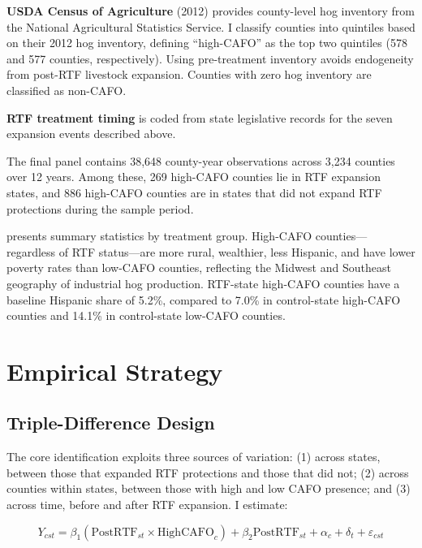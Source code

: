 \documentclass[12pt]{article}
\begin{document}
\textbf{USDA Census of Agriculture} (2012) provides county-level hog inventory from the National Agricultural Statistics Service. I classify counties into quintiles based on their 2012 hog inventory, defining ``high-CAFO'' as the top two quintiles (578 and 577 counties, respectively). Using pre-treatment inventory avoids endogeneity from post-RTF livestock expansion. Counties with zero hog inventory are classified as non-CAFO.

\textbf{RTF treatment timing} is coded from state legislative records for the seven expansion events described above.

The final panel contains 38,648 county-year observations across 3,234 counties over 12 years. Among these, 269 high-CAFO counties lie in RTF expansion states, and 886 high-CAFO counties are in states that did not expand RTF protections during the sample period.



 presents summary statistics by treatment group. High-CAFO counties---regardless of RTF status---are more rural, wealthier, less Hispanic, and have lower poverty rates than low-CAFO counties, reflecting the Midwest and Southeast geography of industrial hog production. RTF-state high-CAFO counties have a baseline Hispanic share of 5.2\%, compared to 7.0\% in control-state high-CAFO counties and 14.1\% in control-state low-CAFO counties.

\section{Empirical Strategy}

\subsection{Triple-Difference Design}

The core identification exploits three sources of variation: (1) across states, between those that expanded RTF protections and those that did not; (2) across counties within states, between those with high and low CAFO presence; and (3) across time, before and after RTF expansion. I estimate:

\begin{equation}
Y_{cst} = \beta_1 (\text{PostRTF}_{st} \times \text{HighCAFO}_c) + \beta_2 \text{PostRTF}_{st} + \alpha_c + \delta_t + \varepsilon_{cst}
\label{eq:ddd}
\end{equation}
\end{document}
